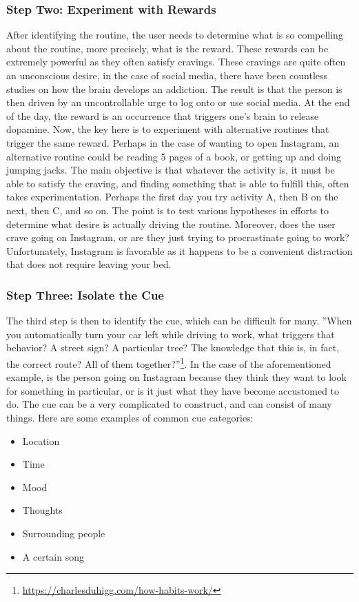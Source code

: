 \subsubsection*{Step Two: Experiment with Rewards}
After identifying the routine, the user needs to determine what is so compelling about the routine, more precisely, what is the reward. These rewards can be extremely powerful as they often satisfy cravings. These cravings are quite often an unconscious desire, in the case of social media, there have been countless studies on how the brain develops an addiction. The result is that the person is then driven by an uncontrollable urge to log onto or use social media. At the end of the day, the reward is an occurrence that triggers one’s brain to release dopamine.
\newline \newline
Now, the key here is to experiment with alternative routines that trigger the same reward. Perhaps in the case of wanting to open Instagram, an alternative routine could be reading 5 pages of a book, or getting up and doing jumping jacks. The main objective is that whatever the activity is, it must be able to satisfy the craving, and finding something that is able to fulfill this, often takes experimentation. Perhaps the first day you try activity A, then B on the next, then C, and so on. The point is to test various hypotheses in efforts to determine what desire is actually driving the routine. Moreover, does the user crave going on Instagram, or are they just trying to procrastinate going to work? Unfortunately, Instagram is favorable as it happens to be a convenient distraction that does not require leaving your bed.
\subsubsection*{Step Three: Isolate the Cue}
The third step is then to identify the cue, which can be difficult for many. ”When you automatically turn your car left while driving to work, what triggers that behavior? A street sign? A particular tree? The knowledge that this is, in fact, the correct route? All of them together?”\footnote{\url{https://charlesduhigg.com/how-habits-work/}}. In the case of the aforementioned example, is the person going on Instagram because they think they want to look for something in particular, or is it just what they have become accustomed to do. The cue can be a very complicated to construct, and can consist of many things. Here are some examples of common cue categories:
\begin{itemize}
    \item Location
    \item Time
    \item Mood
    \item Thoughts
    \item Surrounding people
    \item A certain song
\end{itemize}
